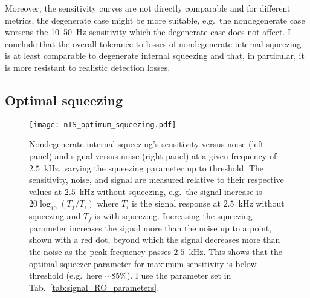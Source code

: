 Moreover, the sensitivity curves are not directly comparable and for different metrics, the degenerate case might be more suitable, e.g.\ the nondegenerate case worsens the 10--50~Hz sensitivity which the degenerate case does not affect. %
I conclude that the overall tolerance to losses of nondegenerate internal squeezing is at least comparable to degenerate internal squeezing and that, in particular, it is more resistant to realistic detection losses.


\subsection{Optimal squeezing}
\label{sec:nIS_optimal_squeezing}

\begin{figure}[ht]
	\centering
	\texttt{[image: nIS\_optimum\_squeezing.pdf]}
	\caption{ Nondegenerate internal squeezing's sensitivity versus noise (left panel) and signal versus noise (right panel) at a given frequency of $2.5$~kHz, varying the squeezing parameter up to threshold. The sensitivity, noise, and signal are measured relative to their respective values at $2.5$~kHz without squeezing, e.g.\ the signal increase is $20\log_{10}(T_f/T_i)$ where $T_i$ is the signal response at $2.5$~kHz without squeezing and $T_f$ is with squeezing. Increasing the squeezing parameter increases the signal more than the noise up to a point, shown with a red dot, beyond which the signal decreases more than the noise as the peak frequency passes $2.5$~kHz. This shows that the optimal squeezer parameter for maximum sensitivity is below threshold (e.g.\ here $\sim85\%$). I use the parameter set in Tab.~\ref{tab:signal_RO_parameters}.
    }
	\label{fig:nIS_optimum_squeezing}
\end{figure}

